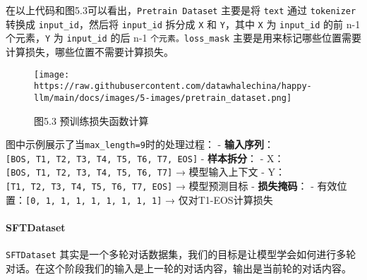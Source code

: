 \documentclass[12pt,a4paper]{book}
\begin{document}
\begin{Shaded}
\begin{Highlighting}[]
\OperatorTok{=}
\OperatorTok{=}\NormalTok{ np.array(input\_id[:}\OperatorTok{{-}}\NormalTok{]).astype(np.int64)}
\OperatorTok{=}\NormalTok{ np.array(input\_id[}\NormalTok{:]).astype(np.int64)}
\OperatorTok{=}\NormalTok{ np.array(loss\_mask[}\NormalTok{:]).astype(np.int64)}
\end{Highlighting}
\end{Shaded}

在以上代码和图5.3可以看出，\texttt{Pretrain\ Dataset} 主要是将
\texttt{text} 通过 \texttt{tokenizer} 转换成 \texttt{input\_id}，然后将
\texttt{input\_id} 拆分成 \texttt{X} 和 \texttt{Y}，其中 \texttt{X} 为
\texttt{input\_id} 的前 n-1 个元素，\texttt{Y} 为 \texttt{input\_id}
的后 n-1 \texttt{个元素。loss\_mask}
主要是用来标记哪些位置需要计算损失，哪些位置不需要计算损失。

\begin{figure}[htbp]\centering
\texttt{[image: https://raw.githubusercontent.com/datawhalechina/happy-llm/main/docs/images/5-images/pretrain\_dataset.png]}
\caption{图5.3 预训练损失函数计算}
\end{figure}

图中示例展示了当\texttt{max\_length=9}时的处理过程： -
\textbf{输入序列}：\texttt{{[}BOS,\ T1,\ T2,\ T3,\ T4,\ T5,\ T6,\ T7,\ EOS{]}}
- \textbf{样本拆分}： -
X：\texttt{{[}BOS,\ T1,\ T2,\ T3,\ T4,\ T5,\ T6,\ T7{]}} →
模型输入上下文 -
Y：\texttt{{[}T1,\ T2,\ T3,\ T4,\ T5,\ T6,\ T7,\ EOS{]}} → 模型预测目标
- \textbf{损失掩码}： -
有效位置：\texttt{{[}0,\ 1,\ 1,\ 1,\ 1,\ 1,\ 1,\ 1,\ 1{]}} →
仅对T1-EOS计算损失

\paragraph{SFTDataset}\label{sftdataset}

\texttt{SFTDataset}
其实是一个多轮对话数据集，我们的目标是让模型学会如何进行多轮对话。在这个阶段我们的输入是上一轮的对话内容，输出是当前轮的对话内容。
\end{document}
